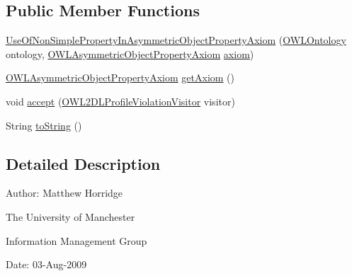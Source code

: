 \subsection*{Public Member Functions}
\begin{DoxyCompactItemize}
\item 
\hyperlink{classorg_1_1semanticweb_1_1owlapi_1_1profiles_1_1_use_of_non_simple_property_in_asymmetric_object_property_axiom_a94c2a14e795264632b2374e07705549e}{Use\-Of\-Non\-Simple\-Property\-In\-Asymmetric\-Object\-Property\-Axiom} (\hyperlink{interfaceorg_1_1semanticweb_1_1owlapi_1_1model_1_1_o_w_l_ontology}{O\-W\-L\-Ontology} ontology, \hyperlink{interfaceorg_1_1semanticweb_1_1owlapi_1_1model_1_1_o_w_l_asymmetric_object_property_axiom}{O\-W\-L\-Asymmetric\-Object\-Property\-Axiom} \hyperlink{classorg_1_1semanticweb_1_1owlapi_1_1profiles_1_1_o_w_l_profile_violation_aa7c8e8910ed3966f64a2c003fb516214}{axiom})
\item 
\hyperlink{interfaceorg_1_1semanticweb_1_1owlapi_1_1model_1_1_o_w_l_asymmetric_object_property_axiom}{O\-W\-L\-Asymmetric\-Object\-Property\-Axiom} \hyperlink{classorg_1_1semanticweb_1_1owlapi_1_1profiles_1_1_use_of_non_simple_property_in_asymmetric_object_property_axiom_ab732da9d63de94de19bd08d3922b21fc}{get\-Axiom} ()
\item 
void \hyperlink{classorg_1_1semanticweb_1_1owlapi_1_1profiles_1_1_use_of_non_simple_property_in_asymmetric_object_property_axiom_a355fb890a28775ae6735e821476574fa}{accept} (\hyperlink{interfaceorg_1_1semanticweb_1_1owlapi_1_1profiles_1_1_o_w_l2_d_l_profile_violation_visitor}{O\-W\-L2\-D\-L\-Profile\-Violation\-Visitor} visitor)
\item 
String \hyperlink{classorg_1_1semanticweb_1_1owlapi_1_1profiles_1_1_use_of_non_simple_property_in_asymmetric_object_property_axiom_ad41ed4d512d2c2426628c751c48dffa7}{to\-String} ()
\end{DoxyCompactItemize}


\subsection{Detailed Description}
Author\-: Matthew Horridge\par
 The University of Manchester\par
 Information Management Group\par
 Date\-: 03-\/\-Aug-\/2009 

